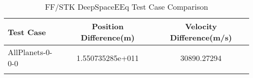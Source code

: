 \begin{table}[htbp!]
\centering
\caption{ FF/STK DeepSpaceEEq Test Case Comparison}
      \begin{tabular}{lcc}
      \hline\hline
          Test Case & Position Difference(m) & Velocity Difference(m/s) \\
         \hline
         AllPlanets-0-0-0 & 1.550735285e+011 & 30890.27294 \\
      \hline\hline
      \label{Table: DeepSpaceEEq FF-STK Table} 
\end{tabular}
\end{table}
